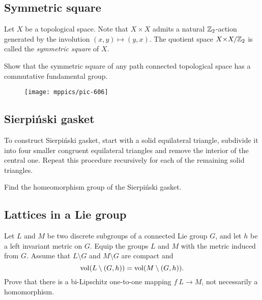 \subsection*{Symmetric square\easy}\label{Symmetric square}

Let $X$ be a topological space.
Note that $X{\times} X$ admits a natural $\mathbb{Z}_2$-action generated by the involution $(x,y)\mapsto (y,x)$.
The quotient  space $X{\times} X/\mathbb{Z}_2$ is called the \emph{symmetric square} of $X$.

\begin{pr} 
Show that the symmetric square 
of any path connected topological space 
has a commutative fundamental group.
\end{pr}

{

\begin{wrapfigure}{r}{23 mm}
\vskip-0mm
\centering
\texttt{[image: mppics/pic-606]}
\end{wrapfigure}

\subsection*{Sierpi\'nski gasket\easy}\label{Sierpinski triangle}

To construct Sierpi\'nski gasket, start with a solid  equilateral triangle, subdivide it into four smaller congruent equilateral triangles and remove the interior of the central one.
Repeat this procedure recursively for each of the remaining solid triangles.

}

\begin{pr} 
Find the homeomorphism group of the Sierpi\'nski gasket.
\end{pr}



\subsection*{Lattices in a Lie group}\label{Boys and girls in a Lie group}

\begin{pr}
Let $L$ and $M$ be two discrete subgroups of a connected Lie group $G$,
and let $h$ be a left invariant metric on $G$.
Equip the groups $L$ and $M$ 
with the metric induced from $G$.
Assume that $L\setminus G$ and $M\setminus G$ are compact and
$$\operatorname{\rm vol}\nolimits(L\setminus (G,h))
=
\operatorname{\rm vol}\nolimits(M\setminus (G,h)).$$
Prove that there is a bi-Lipschitz one-to-one mapping $f\:L
\to
M$, not necessarily a homomorphism.
\end{pr}



